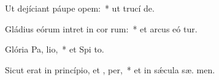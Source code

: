 \item Ut dejíciant páupe  opem:~* ut trucí  de.
\item Gládius eórum intret in cor rum:~* et arcus eó tur.
\item Glória Pa,  lio,~* et Spi to.
\item Sicut erat in princípio, et ,  per,~* et in sǽcula sæ. men.

